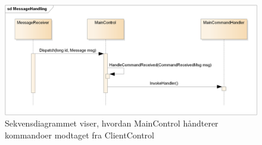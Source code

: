 \begin{figure}[H]
    \centering
    \includegraphics[width=1\textwidth]{Systemdesign/CentralServer/Images/BeskedHaandteringSekvens.png}
    \caption{Sekvensdiagrammet viser, hvordan MainControl håndterer kommandoer modtaget fra ClientControl}
    \label{fig:CSBeskedHaandteringSekvens}
\end{figure}


